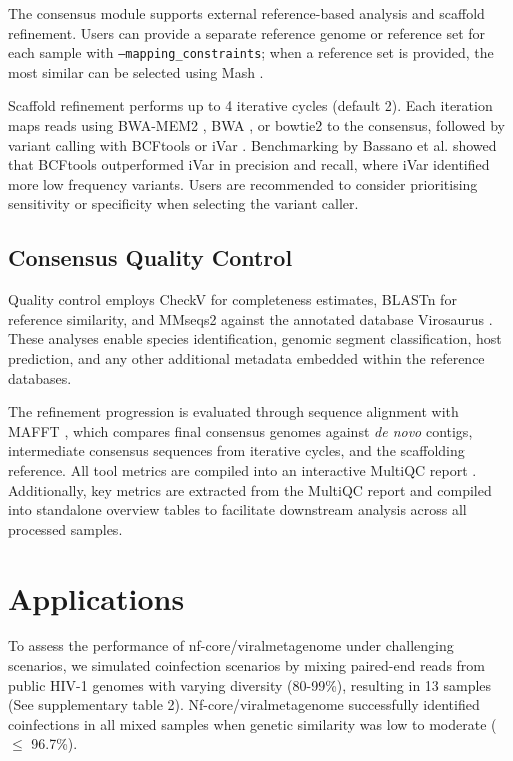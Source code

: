 The consensus module supports external reference-based analysis and scaffold refinement. Users can provide a separate reference genome or reference set for each sample with \texttt{--mapping\_constraints}; when a reference set is provided, the most similar can be selected using Mash \citep{Ondov2019-bo}.

Scaffold refinement performs up to 4 iterative cycles (default 2). Each iteration maps reads using BWA-MEM2 \citep{Vasimuddin2019-rb}, BWA \citep{Li2013-pp}, or bowtie2 \citep{Langmead2019-wx} to the consensus, followed by variant calling with BCFtools \citep{Danecek2021-je} or iVar \citep{Grubaugh2019-xd}. Benchmarking by Bassano et al. \citep{Bassano2022-cl} showed that BCFtools outperformed iVar in precision and recall, where iVar identified more low frequency variants. Users are recommended to consider prioritising sensitivity or specificity when selecting the variant caller.

\subsection{Consensus Quality Control}

Quality control employs CheckV \citep{Nayfach2021-wl} for completeness estimates, BLASTn \citep{Altschul1990-sy} for reference similarity, and MMseqs2 \citep{Steinegger2017-ci} against the annotated database Virosaurus \citep{Gleizes2020-rq}. These analyses enable species identification, genomic segment classification, host prediction, and any other additional metadata embedded within the reference databases.

The refinement progression is evaluated through sequence alignment with MAFFT \citep{Katoh2002-ox}, which compares final consensus genomes against \textit{de novo} contigs, intermediate consensus sequences from iterative cycles, and the scaffolding reference. All tool metrics are compiled into an interactive MultiQC report \citep{Ewels2016-hs}. Additionally, key metrics are extracted from the MultiQC report and compiled into standalone overview tables to facilitate downstream analysis across all processed samples.

\section{Applications}

To assess the performance of nf-core/viralmetagenome under challenging scenarios, we simulated coinfection scenarios by mixing paired-end reads from public HIV-1 genomes with varying diversity (80-99\%), resulting in 13 samples (See supplementary table 2). Nf-core/viralmetagenome successfully identified coinfections in all mixed samples when genetic similarity was low to moderate ($\leq$ 96.7\%).

